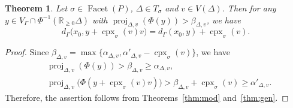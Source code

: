 \documentclass[11pt]{article}
\newtheorem{thm}[theo]{Theorem}
\theoremstyle{definition}
\numberwithin{equation}{section}
\begin{document}
\begin{thm}\label{thm:free}
Let $\sigma \in \operatorname{Facet}(P)$, $\Delta \in T_{\sigma}$ and $v \in V(\Delta)$. 
Then for any $y \in V_{\Gamma} \cap \Phi ^{-1}(\mathbb{R}_{\ge 0} \Delta)$ with $\operatorname{proj}_{\Delta, v} (\Phi(y)) > \beta _{\Delta, v}$, we have  
\[
d_{\Gamma}\bigl( x_0, y + \operatorname{cpx}_{\sigma}(v)v \bigr) 
= d_{\Gamma}( x_0, y) + \operatorname{cpx}_{\sigma}(v). 
\]
\end{thm}
\begin{proof}
Since $\beta_{\Delta, v} = \max \bigl\{ \alpha _{\Delta, v}, \alpha ' _{\Delta, v} - \operatorname{cpx}_{\sigma}(v) \bigr\}$, we have
\begin{align*}
&\operatorname{proj}_{\Delta, v} (\Phi(y)) > \beta _{\Delta, v}  \ge \alpha _{\Delta, v}, \\
&\operatorname{proj}_{\Delta, v} \bigl( \Phi(y + \operatorname{cpx}_{\sigma}(v)v ) \bigr) 
> \beta _{\Delta, v} + \operatorname{cpx}_{\sigma}(v) \ge \alpha' _{\Delta, v}. 
\end{align*}
Therefore, the assertion follows from Theorems~\ref{thm:mod} and~\ref{thm:gen}. 
\end{proof}
\end{document}
